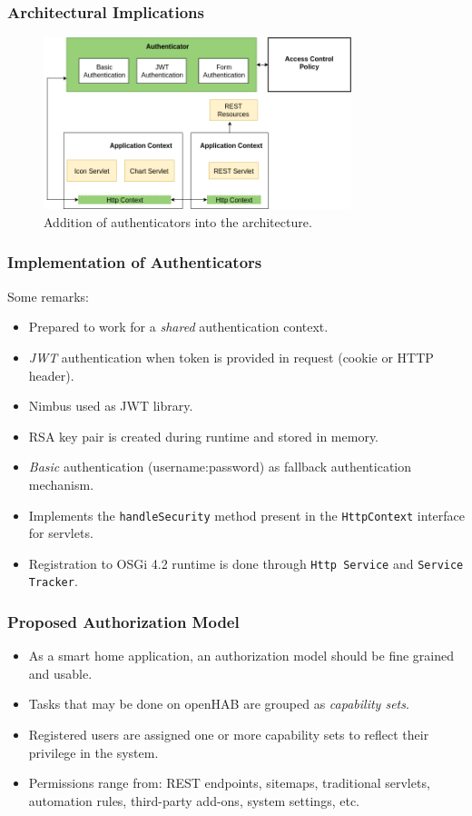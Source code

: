 \documentclass{beamer}
\begin{document}
\begin{frame}
\frametitle{Architectural Implications}
\begin{figure} [ht] 
\begin{center}
\includegraphics[width=0.8\textwidth]{esh_arch_authenticator}
\caption{Addition of authenticators into the architecture.}
\label{fig:esh_arch_authenticator}
\end{center}
\end{figure}
\end{frame}
\begin{frame}
\frametitle{Implementation of Authenticators}
Some remarks:
\begin{itemize}
  \setlength\itemsep{1.5em}
\item Prepared to work for a \emph{shared} authentication context.
\item \emph{JWT} authentication when token is provided in request (cookie or HTTP header).
\item Nimbus used as JWT library. 
\item RSA key pair is created during runtime and stored in memory. 
\item \emph{Basic} authentication (username:password) as fallback authentication mechanism.
\item Implements the \texttt{handleSecurity} method present in the \texttt{HttpContext} interface for servlets.
\item Registration to OSGi 4.2 runtime is done through \texttt{Http Service} and \texttt{Service Tracker}.
\end{itemize}
\end{frame}
\begin{frame}
\frametitle{Proposed Authorization Model}
\begin{itemize}
  \setlength\itemsep{1.5em}
\item As a smart home application, an authorization model should be fine grained and usable.
\item Tasks that may be done on openHAB are grouped as \emph{capability sets}.
\item Registered users are assigned one or more capability sets to reflect their privilege in the system.
\item Permissions range from: REST endpoints, sitemaps, traditional servlets, automation rules, third-party add-ons, system settings, etc.
\end{itemize}
\end{frame}
\end{document}

